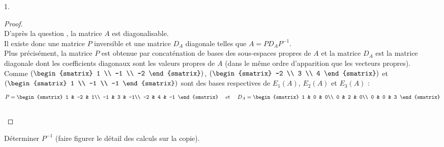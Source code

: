 \documentclass[11pt]{article}%
\begin{document}
\begin{noliste}{1.}
  \begin{proof}~\\
    D'après la question , la matrice $A$ est diagonalisable.\\
    Il existe donc une matrice $P$ inversible et une matrice $D_A$
    diagonale telles que $A = PD_AP^{-1}$.\\
    Plus précisément, la matrice $P$ est obtenue par concaténation de
    bases des sous-espaces propres de $A$ et la matrice $D_A$ est la
    matrice diagonale dont les coefficients diagonaux sont les valeurs
    propres de $A$ (dans le même ordre d'apparition que les vecteurs
    propres).\\
    Comme $\left(
      \begin{smatrix}
        1 \\
        -1 \\
        -2
      \end{smatrix}
    \right)$, $\left(
      \begin{smatrix}
        -2 \\
        3 \\
        4
      \end{smatrix}
    \right)$ et $\left(
      \begin{smatrix}
        1 \\
        -1 \\
        -1
      \end{smatrix}
    \right)$ sont des bases respectives de $E_1(A)$, $E_2(A)$ et
    $E_3(A)$ :
    \[
    P=
    \begin{smatrix}
      1 & -2 & 1\\
      -1 & 3 & -1\\
      -2 & 4 & -1
    \end{smatrix}
    \quad \text{ et } \quad %
    D_A=
    \begin{smatrix}
      1 & 0 & 0\\
      0 & 2 & 0\\
      0 & 0 & 3
    \end{smatrix}
    \]
    ~\\[-1cm]
  \end{proof}




 \item Déterminer $P^{-1}$ (faire figurer le détail des calculs sur la 
 copie).
 

\end{noliste}
\end{document}

